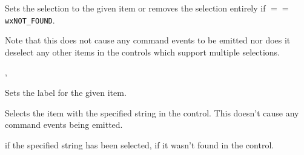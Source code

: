 
Sets the selection to the given item  or removes the selection entirely
if  $==$ {\tt wxNOT\_FOUND}.

Note that this does not cause any command events to be emitted nor does it
deselect any other items in the controls which support multiple selections.




,\rtfsp
{}


\label{wxcontrolwithitemssetstring}


Sets the label for the given item.





\label{wxcontrolwithitemssetstringselection}


Selects the item with the specified string in the control. This doesn't cause
any command events being emitted.




\true if the specified string has been selected, \false if it wasn't found in
the control.


